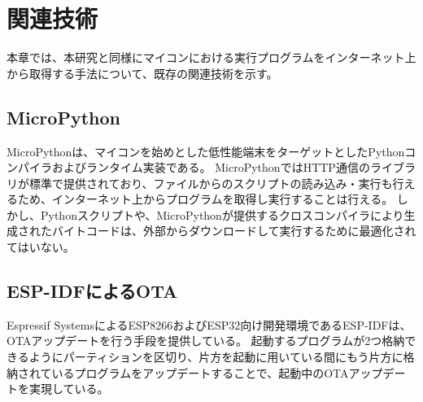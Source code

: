 \chapter{関連技術}
\label{chap:related_works}

本章では、本研究と同様にマイコンにおける実行プログラムをインターネット上から取得する手法について、既存の関連技術を示す。

\section{MicroPython}

MicroPythonは、マイコンを始めとした低性能端末をターゲットとしたPythonコンパイラおよびランタイム実装である\cite{micropython}。
MicroPythonではHTTP通信のライブラリが標準で提供されており、ファイルからのスクリプトの読み込み・実行も行えるため、インターネット上からプログラムを取得し実行することは行える。
しかし、Pythonスクリプトや、MicroPythonが提供するクロスコンパイラにより生成されたバイトコードは、外部からダウンロードして実行するために最適化されてはいない。

\section{ESP-IDFによるOTA}

Espressif SystemsによるESP8266およびESP32向け開発環境であるESP-IDF\cite{esp_idf}は、OTAアップデートを行う手段を提供している\cite{esp_ota}。
起動するプログラムが2つ格納できるようにパーティションを区切り、片方を起動に用いている間にもう片方に格納されているプログラムをアップデートすることで、起動中のOTAアップデートを実現している。

